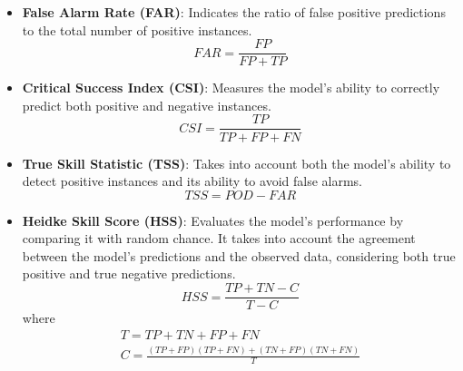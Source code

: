 \begin{itemize}
    \item \textbf{False Alarm Rate (FAR)}: Indicates the ratio of false positive predictions to the total number of positive instances.
    \begin{equation}
        FAR = \frac{FP}{FP + TP}
    \end{equation}

    \item \textbf{Critical Success Index (CSI)}: Measures the model's ability to correctly predict both positive and negative instances.
    \begin{equation}
        CSI = \frac{TP}{TP + FP + FN}
    \end{equation}

    \item \textbf{True Skill Statistic (TSS)}: Takes into account both the model's ability to detect positive instances and its ability to avoid false alarms.
    \begin{equation}
        TSS = POD - FAR
    \end{equation}

    \item \textbf{Heidke Skill Score (HSS)}: Evaluates the model's performance by comparing it with random chance. It takes into account the agreement between the model's predictions and the observed data, considering both true positive and true negative predictions.
    \begin{equation}
        HSS = \frac{TP + TN - C}{T - C}
    \end{equation}
    where
    \begin{subequations}
        \begin{gather*}
            T = TP + TN + FP + FN\\
            C = \frac{(TP+FP)(TP+FN) + (TN+FP)(TN+FN)}{T}
        \end{gather*}
    \end{subequations}
\end{itemize}